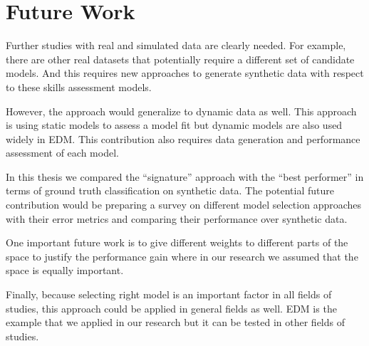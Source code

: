 
\section{Future Work}

Further studies with real and simulated data are clearly needed.  For example, there are other real datasets that potentially require a different set of candidate models. And this requires new approaches to generate synthetic data with respect to these skills assessment models.

However, the approach would generalize to dynamic data as well. This approach is using static models to assess a model fit but dynamic models are also used widely in EDM. This contribution also requires data generation and performance assessment of each model.

In this thesis we compared the ``signature'' approach with the ``best performer'' in terms of ground truth classification on synthetic data. The potential future contribution would be preparing a survey on different model selection approaches with their error metrics and comparing their performance over synthetic data.

One important future work is to give different weights to different parts of the space to justify the performance gain where in our research we assumed that the space is equally important.

Finally, because selecting right model is an important factor in all fields of studies, this approach could be applied in general fields as well. EDM is the example that we applied in our research but it can be tested in other fields of studies.
